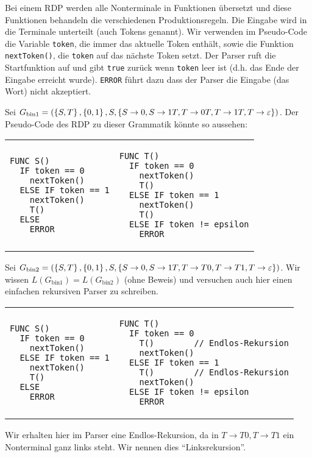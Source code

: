 Bei einem RDP werden alle Nonterminale in Funktionen übersetzt und diese Funktionen behandeln die verschiedenen Produktionsregeln.
Die Eingabe wird in die Terminale unterteilt (auch Tokens genannt).
Wir verwenden im Pseudo-Code die Variable \verb|token|, die immer das aktuelle Token enthält, sowie die Funktion \verb|nextToken()|, die \verb|token| auf das nächste Token setzt.
Der Parser ruft die Startfunktion auf und gibt \verb|true| zurück wenn \verb|token| leer ist (d.h. das Ende der Eingabe erreicht wurde). \verb|ERROR| führt dazu dass der Parser die Eingabe (das Wort) nicht akzeptiert.

Sei $G_{\text{bin1}}=(\left\{S,T\right\},\left\{0,1\right\},S,\left\{S \to 0,S \to 1T, T \to 0T, T \to 1T, T \to \varepsilon\right\})$.
Der Pseudo-Code des RDP zu dieser Grammatik könnte so aussehen:

\begin{tabular}{p{0.47\hsize}p{0.47\hsize}}
\begin{verbatim}
FUNC S()
  IF token == 0
    nextToken()
  ELSE IF token == 1
    nextToken()
    T()
  ELSE
    ERROR
\end{verbatim}
&
\begin{verbatim}
FUNC T()
  IF token == 0
    nextToken()
    T()
  ELSE IF token == 1
    nextToken()
    T()
  ELSE IF token != epsilon
    ERROR  
\end{verbatim}
\end{tabular}

Sei $G_{\text{bin2}}=\left(\left\{S,T\right\},\left\{0,1\right\},S,\left\{S \to 0, S \to 1T, T \to T0, T \to T1, T \to \varepsilon\right\}\right)$.
Wir wissen $L(G_{\text{bin1}})=L(G_{\text{bin2}})$ (ohne Beweis) und versuchen auch hier einen einfachen rekursiven Parser zu schreiben.

\begin{tabular}{p{0.47\hsize}p{0.47\hsize}}
\begin{verbatim}
FUNC S()
  IF token == 0
    nextToken()
  ELSE IF token == 1
    nextToken()
    T()
  ELSE
    ERROR
\end{verbatim}
&
\begin{verbatim}
FUNC T()
  IF token == 0
    T()        // Endlos-Rekursion
    nextToken()
  ELSE IF token == 1
    T()        // Endlos-Rekursion
    nextToken()
  ELSE IF token != epsilon
    ERROR  
\end{verbatim}
\end{tabular}

Wir erhalten hier im Parser eine Endlos-Rekursion, da in $T \to T0, T \to T1$ ein Nonterminal ganz links steht. Wir nennen dies ``Linksrekursion''.

